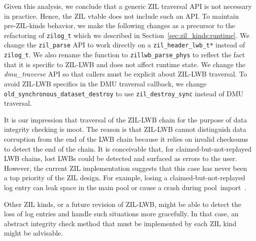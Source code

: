 \documentclass[12pt,a4paper,twoside]{book}
\begin{document}
Given this analysis, we conclude that a generic ZIL traversal API is not necessary in practice.
Hence, the ZIL vtable does not include such an API.
To maintain pre-ZIL-kinds behavior, we make the following changes as a precursor to the refactoring of \lstinline{zilog_t} which we described in Section~\ref{sec:zil_kinds:runtime}.
We change the \lstinline{zil_parse} API to work directly on a \lstinline{zil_header_lwb_t*} instead of \lstinline{zilog_t}.
We also rename the function to \lstinline{zillwb_parse_phys} to reflect the fact that it is specific to ZIL-LWB and does not affect runtime state.
We change the \textit{dmu\_traverse} API so that callers must be explicit about ZIL-LWB traversal.
To avoid ZIL-LWB specifics in the DMU traversal callback, we change \lstinline{old_synchronous_dataset_destroy} to use \lstinline{zil_destroy_sync} instead of DMU traversal.

It is our impression that traversal of the ZIL-LWB chain for the purpose of data integrity checking is moot.
The reason is that ZIL-LWB cannot distinguish data corruption from the end of the LWB chain because it relies on invalid checksums to detect the end of the chain.
It is conceivable that, for claimed-but-not-replayed LWB chains, lost LWBs could be detected and surfaced as errors to the user.
However, the current ZIL implementation suggests that this case has never been a top priority of the ZIL design.
For example, losing a claimed-but-not-replayed log entry can leak space in the main pool or cause a crash during \mbox{pool import \cite{OpenZFSGithubIssueHandlingOfLostClaimedNotReplayedLogRecords,OpenZFSGithubIssueFailingDebugAssertionWhenLosingClaimedNotReplayedLWBs}}.

Other ZIL kinds, or a future revision of ZIL-LWB, might be able to detect the loss of log entries and handle such situations more gracefully.
In that case, an abstract integrity check method that must be implemented by each ZIL kind might be advisable.
\end{document}
